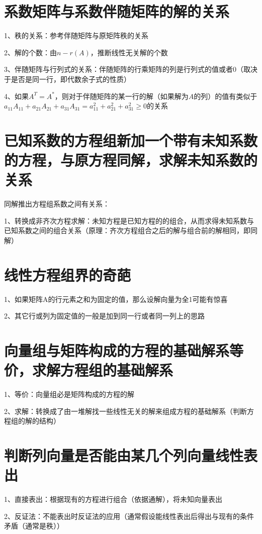 \section{系数矩阵与系数伴随矩阵的解的关系}

1、秩的关系：参考伴随矩阵与原矩阵秩的关系

2、解的个数：由$n - r(A)$，推断线性无关解的个数

3、伴随矩阵与行列式的关系：伴随矩阵的行乘矩阵的列是行列式的值或者0（取决于是否是同一行，即代数余子式的性质）

4、如果$A^T=A^*$，则对于伴随矩阵的某一行的解（如果解为$A$的列）的值有类似于$a_{11}A_{11}+a_{21}A_{21}+a_{31}A_{31} = a_{11}^2 + a_{21}^2+a_{31}^2\ge 0$的关系

\section{已知系数的方程组新加一个带有未知系数的方程，与原方程同解，求解未知系数的关系}

同解推出方程组系数之间有关系：

1、转换成非齐次方程求解：未知方程是已知方程的的组合，从而求得未知系数与已知系数之间的组合关系（原理：齐次方程组合之后的解与组合前的解相同，即同解）

\section{线性方程组界的奇葩}

1、如果矩阵A的行元素之和为固定的值，那么设解向量为全1可能有惊喜

2、其它行或列为固定值的一般是加到同一行或者同一列上的思路

\section{向量组与矩阵构成的方程的基础解系等价，求解方程组的基础解系}

1、等价：向量组必是矩阵构成的方程的解

2、求解：转换成了由一堆解找一些线性无关的解来组成方程的基础解系（判断方程组的解的结构）



\section{判断列向量是否能由某几个列向量线性表出}

1、直接表出：根据现有的方程进行组合（依据通解），将未知向量表出

2、反证法：不能表出时反证法的应用（通常假设能线性表出后得出与现有的条件矛盾（通常是秩））

